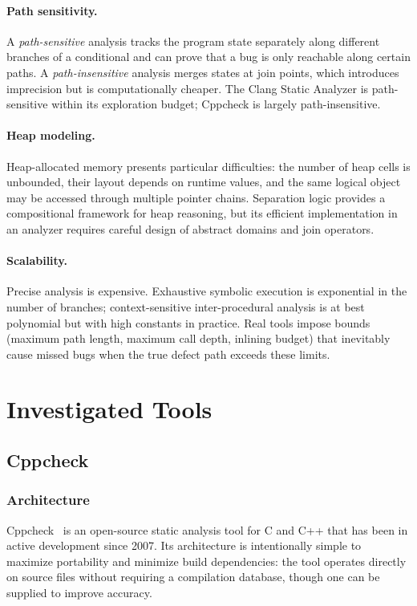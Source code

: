 \documentclass[11pt,a4paper]{article}
\begin{document}
\paragraph{Path sensitivity.} A \emph{path-sensitive} analysis tracks the program state separately along different branches of a conditional and can prove that a bug is only reachable along certain paths. A \emph{path-insensitive} analysis merges states at join points, which introduces imprecision but is computationally cheaper. The Clang Static Analyzer is path-sensitive within its exploration budget; Cppcheck is largely path-insensitive.

\paragraph{Heap modeling.} Heap-allocated memory presents particular difficulties: the number of heap cells is unbounded, their layout depends on runtime values, and the same logical object may be accessed through multiple pointer chains. Separation logic provides a compositional framework for heap reasoning, but its efficient implementation in an analyzer requires careful design of abstract domains and join operators.

\paragraph{Scalability.} Precise analysis is expensive. Exhaustive symbolic execution is exponential in the number of branches; context-sensitive inter-procedural analysis is at best polynomial but with high constants in practice. Real tools impose bounds (maximum path length, maximum call depth, inlining budget) that inevitably cause missed bugs when the true defect path exceeds these limits.


\section{Investigated Tools} 
\label{sec:tools}

\subsection{Cppcheck}

\subsubsection{Architecture}

Cppcheck~\cite{cppcheck} is an open-source static analysis tool for C and C++ that has been in active development since 2007. Its architecture is intentionally simple to maximize portability and minimize build dependencies: the tool operates directly on source files without requiring a compilation database, though one can be supplied to improve accuracy.
\end{document}
